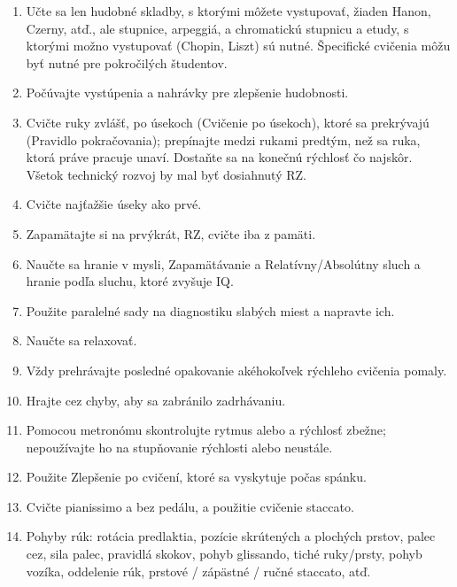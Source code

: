 \documentclass[11pt,a4paper]{book}
\begin{document}
\begin{enumerate}
\item Učte sa len hudobné skladby, s ktorými môžete vystupovať, žiaden Hanon, Czerny, atď., ale stupnice, arpeggiá, a chromatickú stupnicu a etudy, s ktorými možno vystupovať (Chopin, Liszt) sú nutné. Špecifické cvičenia môžu byť nutné pre pokročilých študentov.

\item Počúvajte vystúpenia a nahrávky pre zlepšenie hudobnosti.

\item Cvičte ruky zvlášť, po úsekoch (Cvičenie po úsekoch), ktoré sa prekrývajú (Pravidlo pokračovania); prepínajte medzi rukami predtým, než sa ruka, ktorá práve pracuje unaví. Dostaňte sa na konečnú rýchlosť čo najskôr. Všetok technický rozvoj by mal byť dosiahnutý RZ.

\item Cvičte najťažšie úseky ako prvé.

\item Zapamätajte si na prvýkrát, RZ, cvičte iba z pamäti.

\item Naučte sa hranie v mysli, Zapamätávanie a Relatívny/Absolútny sluch a hranie podľa sluchu, ktoré zvyšuje IQ.

\item Použite paralelné sady na diagnostiku slabých miest a napravte ich.

\item Naučte sa relaxovať.

\item Vždy prehrávajte posledné opakovanie akéhokoľvek rýchleho cvičenia pomaly.

\item Hrajte cez chyby, aby sa zabránilo zadrhávaniu.

\item Pomocou metronómu skontrolujte rytmus alebo a rýchlosť zbežne; nepoužívajte ho na stupňovanie rýchlosti alebo neustále.

\item Použite Zlepšenie po cvičení, ktoré sa vyskytuje počas spánku. 

\item Cvičte pianissimo a bez pedálu, a použitie cvičenie staccato.

\item Pohyby rúk: rotácia predlaktia, pozície skrútených a plochých prstov, palec cez, sila palec, 
pravidlá skokov, pohyb glissando, tiché ruky/prsty, pohyb vozíka, oddelenie rúk, prstové / zápästné / ručné staccato, atď.


\end{enumerate}
\end{document}

